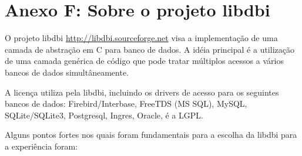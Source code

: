 % 
% 
% 
% 

\section{Anexo F: Sobre o projeto libdbi} \label{sec:anexog}

O projeto libdbi \url{http://libdbi.sourceforge.net} visa a implementação de uma camada de abstração em C para banco de dados. A idéia principal é a utilização de uma camada genérica de código que pode tratar múltiplos acessos a vários bancos de dados simultâneamente. 

A licença utiliza pela libdbi, incluindo os drivers de acesso para os seguintes bancos de dados: Firebird/Interbase, FreeTDS (MS SQL), MySQL, SQLite/SQLite3, Postgresql, Ingres, Oracle, é a LGPL.

Alguns pontos fortes nos quais foram fundamentais para a escolha da libdbi para a experiência foram: 

